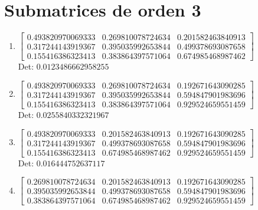 \documentclass[12pt]{article}
\begin{document}
\section*{Submatrices de orden 3}

\begin{enumerate}

\item $\displaystyle \left[\begin{matrix}0.493820970069333 & 0.269810078724634 & 0.201582463840913\\0.317244143919367 & 0.395035992653844 & 0.499378693087658\\0.155416386323413 & 0.383864397571064 & 0.674985468987462\end{matrix}\right]$\\

Det: $0.0123486662958255$\\

\item $\displaystyle \left[\begin{matrix}0.493820970069333 & 0.269810078724634 & 0.192671643090285\\0.317244143919367 & 0.395035992653844 & 0.594847901983696\\0.155416386323413 & 0.383864397571064 & 0.929524659551459\end{matrix}\right]$\\

Det: $0.0255840332321967$\\

\item $\displaystyle \left[\begin{matrix}0.493820970069333 & 0.201582463840913 & 0.192671643090285\\0.317244143919367 & 0.499378693087658 & 0.594847901983696\\0.155416386323413 & 0.674985468987462 & 0.929524659551459\end{matrix}\right]$\\

Det: $0.016444752637117$\\

\item $\displaystyle \left[\begin{matrix}0.269810078724634 & 0.201582463840913 & 0.192671643090285\\0.395035992653844 & 0.499378693087658 & 0.594847901983696\\0.383864397571064 & 0.674985468987462 & 0.929524659551459\end{matrix}\right]$\\


\end{enumerate}
\end{document}
